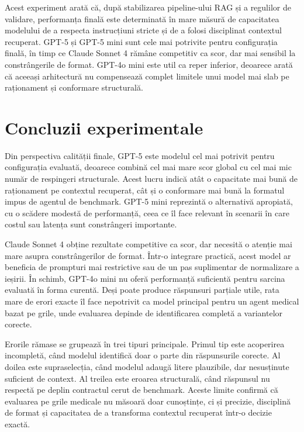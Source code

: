 \documentclass[12pt, a4paper, oneside, romanian]{teza-upb}
\begin{document}
Acest experiment arată că, după stabilizarea pipeline-ului RAG și a regulilor de validare, performanța finală este determinată în mare măsură de capacitatea modelului de a respecta instrucțiuni stricte și de a folosi disciplinat contextul recuperat. GPT-5 și GPT-5 mini sunt cele mai potrivite pentru configurația finală, în timp ce Claude Sonnet 4 rămâne competitiv ca scor, dar mai sensibil la constrângerile de format. GPT-4o mini este util ca reper inferior, deoarece arată că aceeași arhitectură nu compensează complet limitele unui model mai slab pe raționament și conformare structurală.

\section{Concluzii experimentale}

Din perspectiva calității finale, GPT-5 este modelul cel mai potrivit pentru configurația evaluată, deoarece combină cel mai mare scor global cu cel mai mic număr de respingeri structurale. Acest lucru indică atât o capacitate mai bună de raționament pe contextul recuperat, cât și o conformare mai bună la formatul impus de agentul de benchmark. GPT-5 mini reprezintă o alternativă apropiată, cu o scădere modestă de performanță, ceea ce îl face relevant în scenarii în care costul sau latența sunt constrângeri importante.

Claude Sonnet 4 obține rezultate competitive ca scor, dar necesită o atenție mai mare asupra constrângerilor de format. Într-o integrare practică, acest model ar beneficia de prompturi mai restrictive sau de un pas suplimentar de normalizare a ieșirii. În schimb, GPT-4o mini nu oferă performanță suficientă pentru sarcina evaluată în forma curentă. Deși poate produce răspunsuri parțiale utile, rata mare de erori exacte îl face nepotrivit ca model principal pentru un agent medical bazat pe grile, unde evaluarea depinde de identificarea completă a variantelor corecte.

Erorile rămase se grupează în trei tipuri principale. Primul tip este acoperirea incompletă, când modelul identifică doar o parte din răspunsurile corecte. Al doilea este supraselecția, când modelul adaugă litere plauzibile, dar nesusținute suficient de context. Al treilea este eroarea structurală, când răspunsul nu respectă pe deplin contractul cerut de benchmark. Aceste limite confirmă că evaluarea pe grile medicale nu măsoară doar cunoștințe, ci și precizie, disciplină de format și capacitatea de a transforma contextul recuperat într-o decizie exactă.
\end{document}
